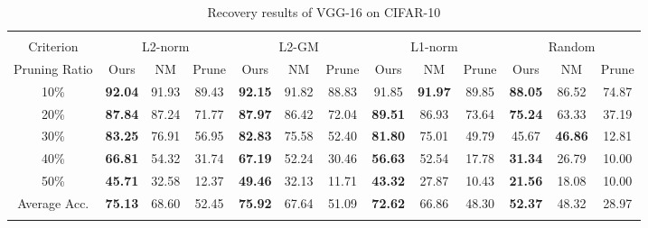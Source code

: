 \begin{table*}[t] %
\centering
{\scriptsize 
\begin{tabular}{c||c|c|c||c|c|c||c|c|c||c|c|c}  \Xhline{2\arrayrulewidth}
\multicolumn{13}{c}{\textbf{VGG-16 (Acc. 93.7)}}
\\ \Xhline{2\arrayrulewidth} %
Criterion & \multicolumn{3}{c||}{L2-norm} & \multicolumn{3}{c||}{L2-GM} & \multicolumn{3}{c||}{L1-norm}& \multicolumn{3}{c}{Random}\\ \hline
Pruning Ratio& Ours& NM& Prune& Ours& NM& Prune& Ours& NM& Prune& Ours& NM& Prune\\ \Xhline{2\arrayrulewidth}
10\%& \textbf{92.04} & 91.93 & 89.43 & \textbf{92.15} & 91.82 & 88.83 & 91.85 & \textbf{91.97} & 89.85 & \textbf{88.05} & 86.52 & 74.87 \\\hline
20\%& \textbf{87.84} & 87.24 & 71.77 & \textbf{87.97} & 86.42 & 72.04 & \textbf{89.51} & 86.93 & 73.64 & \textbf{75.24} & 63.33 & 37.19 \\ \hline
30\%& \textbf{83.25} & 76.91 & 56.95 & \textbf{82.83} & 75.58 & 52.40 & \textbf{81.80} & 75.01 & 49.79 & 45.67 & \textbf{46.86} & 12.81 \\ \hline
40\%& \textbf{66.81} & 54.32 & 31.74 & \textbf{67.19} & 52.24 & 30.46 & \textbf{56.63} & 52.54 & 17.78 & \textbf{31.34} & 26.79 & 10.00 \\ \hline
50\%& \textbf{45.71} & 32.58 & 12.37 & \textbf{49.46} & 32.13 & 11.71 & \textbf{43.32} & 27.87 & 10.43 & \textbf{21.56} & 18.08 & 10.00 \\ \Xhline{2\arrayrulewidth}
Average Acc. & \textbf{75.13} & 68.60 & 52.45 & \textbf{75.92} & 67.64 & 51.09 & \textbf{72.62} & 66.86 & 48.30 & \textbf{52.37} & 48.32 & 28.97\\ \Xhline{2\arrayrulewidth}   
\end{tabular}
}
\vspace{-1.5mm}
\caption{Recovery results of VGG-16 on CIFAR-10}
\label{tab:VGG16-CIFAR10}
\vspace{1.5mm}
{\scriptsize

}
\end{table*}
